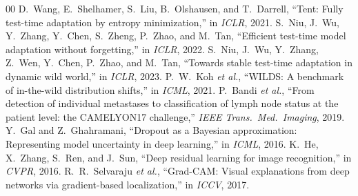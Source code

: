 \documentclass[conference]{IEEEtran}
\begin{document}
\begin{thebibliography}{00}
 D.~Wang, E.~Shelhamer, S.~Liu, B.~Olshausen, and T.~Darrell, ``Tent: Fully test-time adaptation by entropy minimization,'' in \emph{ICLR}, 2021.
 S.~Niu, J.~Wu, Y.~Zhang, Y.~Chen, S.~Zheng, P.~Zhao, and M.~Tan, ``Efficient test-time model adaptation without forgetting,'' in \emph{ICLR}, 2022.
 S.~Niu, J.~Wu, Y.~Zhang, Z.~Wen, Y.~Chen, P.~Zhao, and M.~Tan, ``Towards stable test-time adaptation in dynamic wild world,'' in \emph{ICLR}, 2023.
 P.~W.~Koh \emph{et al.}, ``WILDS: A benchmark of in-the-wild distribution shifts,'' in \emph{ICML}, 2021.
 P.~Bandi \emph{et al.}, ``From detection of individual metastases to classification of lymph node status at the patient level: the CAMELYON17 challenge,'' \emph{IEEE Trans.\ Med.\ Imaging}, 2019.
 Y.~Gal and Z.~Ghahramani, ``Dropout as a Bayesian approximation: Representing model uncertainty in deep learning,'' in \emph{ICML}, 2016.
 K.~He, X.~Zhang, S.~Ren, and J.~Sun, ``Deep residual learning for image recognition,'' in \emph{CVPR}, 2016.
 R.~R.~Selvaraju \emph{et al.}, ``Grad-CAM: Visual explanations from deep networks via gradient-based localization,'' in \emph{ICCV}, 2017.
\end{thebibliography}
\end{document}
